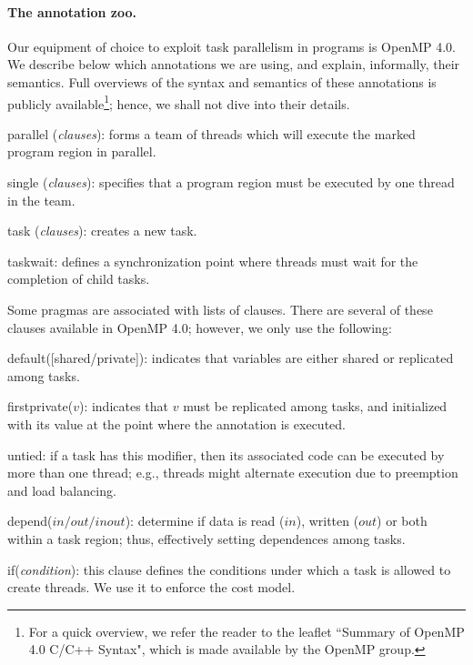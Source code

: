 \documentclass[sigplan,10pt,review,anonymous]{acmart}
\begin{document}
\paragraph{The annotation zoo.}
Our equipment of choice to exploit task parallelism in programs is OpenMP 4.0.
We describe below which annotations we are using, and explain, informally, their
semantics.
Full overviews of the syntax and semantics of these annotations is publicly
available\footnote{For a quick overview, we refer the reader to the leaflet
``Summary of OpenMP 4.0 C/C++ Syntax", which is made available by the OpenMP
group.}; hence, we shall not dive into their details.
%
\begin{compactitem}
\item \textsf{parallel} (\textit{clauses}): forms a team of threads
which will execute the marked program region in parallel.
\item \textsf{single} (\textit{clauses}): specifies that a
program region must be executed by one thread in the team.
\item \textsf{task} (\textit{clauses}): creates a new task.
\item \textsf{taskwait}: defines a synchronization point where
threads must wait for the completion of child tasks.
\end{compactitem}
%
Some pragmas are associated with lists of clauses.
There are several of these clauses available in OpenMP 4.0; however, we only use
the following:
\begin{compactitem}
\item \textsf{default([shared/private])}: indicates that variables are either
shared or replicated among tasks.
\item \textsf{firstprivate($v$)}: indicates that $v$ must be replicated among
tasks, and initialized with its value at the point where the annotation is
executed.
\item \textsf{untied}: if a task has this modifier, then its associated code can
be executed by more than one thread; e.g., threads might alternate execution due
to preemption and load balancing.
\item \textsf{depend}($\mathit{in}/\mathit{out}/\mathit{inout}$):
determine if data is read ($\mathit{in}$), written ($\mathit{out}$) or both
within a task region; thus, effectively setting dependences among tasks.
\item \textsf{if}({\em condition}): this clause defines the conditions
under which a task is allowed to create threads.
We use it to enforce the cost model.
\end{compactitem}
\end{document}
